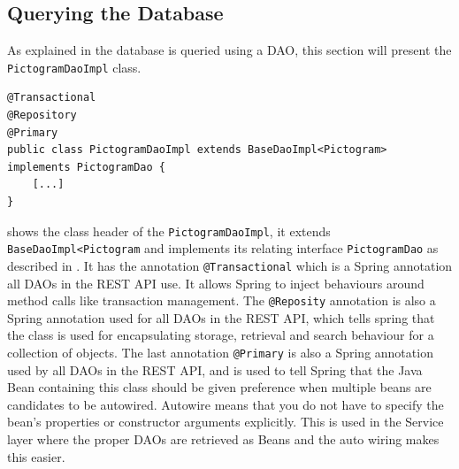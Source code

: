 \subsection{Querying the Database}
As explained in  the database is queried using a DAO, this section will present the \texttt{PictogramDaoImpl} class.

\begin{lstlisting}[float, floatplacement=h, caption={The class header of the \texttt{PictogramDao}, along with its annotations. \texttt{[...]} denotes omitted code.},label={lst:pictogramDaoImpl}]
@Transactional
@Repository
@Primary
public class PictogramDaoImpl extends BaseDaoImpl<Pictogram> implements PictogramDao {
	[...]
}
\end{lstlisting}

 shows the class header of the \texttt{PictogramDaoImpl}, it extends \texttt{BaseDaoImpl<Pictogram} and implements its relating interface \texttt{PictogramDao} as described in .
It has the annotation \texttt{@Transactional} which is a Spring annotation all DAOs in the REST API use.
It allows Spring to inject behaviours around method calls like transaction management.
The \texttt{@Reposity} annotation is also a Spring annotation used for all DAOs in the REST API, which tells spring that the class is used for encapsulating storage, retrieval and search behaviour for a collection of objects.
The last annotation \texttt{@Primary} is also a Spring annotation used by all DAOs in the REST API, and is used to tell Spring that the Java Bean  containing this class should be given preference when multiple beans are candidates to be autowired.
Autowire means that you do not have to specify the bean's properties or constructor arguments explicitly. 
This is used in the Service layer where the proper DAOs are retrieved as Beans and the auto wiring makes this easier.
\\

